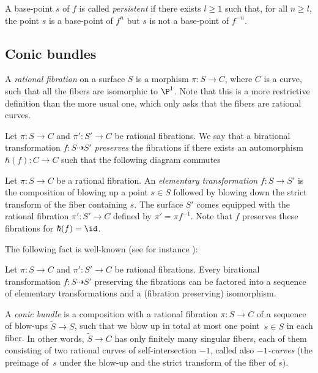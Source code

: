 A base-point $s$ of $f$ is called \emph{persistent} if there exists $l\geq 1$ such that, for all $n\geq l$, the point $s$ is a base-point of $f^n$ but $s$ is not a base-point of $f^{-n}$.

\subsection{Conic bundles}

A \emph{rational fibration} on a surface $S$ is a morphism $\pi\colon S\to C$, where $C$ is a
curve, such that all the fibers are isomorphic to $\P^1$. Note that this is a more restrictive definition than the more usual one, which only asks that the fibers are rational curves.

Let $\pi\colon S\to C$ and $\pi'\colon S'\to C$ be rational fibrations.
We say that a birational transformation $f \colon S\dashrightarrow S'$ \emph{preserves} the fibrations if there exists an automorphism $\hbar(f)\colon C\to C$ such that the following diagram commutes
\begin{center}
\end{center}

{ Let $\pi\colon S\to C$ be a rational fibration. An \emph{elementary transformation} $f\colon S\to S'$ is the composition of blowing up a point $s\in S$ followed by blowing down the strict transform of the fiber containing $s$. The surface $S'$ comes equipped with the rational fibration $\pi'\colon S'\to C$ defined by {$\pi'=\pi f^{-1}$}. Note that $f$ preserves these fibrations for $\hbar(f)=\id$.}

The following fact is well-known (see for instance \cite[Cor.\,3.2]{schneider2022relations}):
\begin{proposition}\label{prop:elementary}
Let $\pi\colon S\to C$ and $\pi'\colon S'\to C$ be rational fibrations.
Every birational transformation $f\colon S\dashrightarrow S'$ preserving the fibrations can be factored { into a sequence of elementary transformations and a (fibration preserving) isomorphism}.
\end{proposition}

A \emph{conic bundle} is a composition with a rational fibration $\pi\colon S\to C$ of a sequence of blow-ups $\tilde S\to S$, such that we blow up {in total} at most one point~$s\in S$ in each fiber. {In other words, $\tilde S\to C$ has only finitely many singular fibers, each of them consisting of
two rational curves of self-intersection $-1$, called also \emph{$-1$-curves} (the preimage of~$s$ under the blow-up and the strict transform of the fiber of $s$).}

